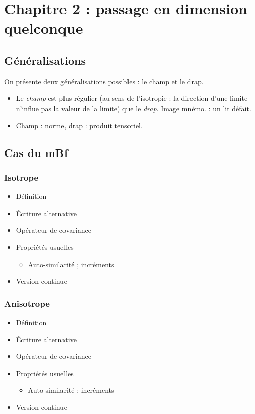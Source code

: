 \documentclass[11pt]{article}
\begin{document}
\section{Chapitre 2 : passage en dimension quelconque}
\label{sec:orga2e90c2}
\subsection{Généralisations}
\label{sec:org0454e05}
On présente deux généralisations possibles : le champ et le drap.
\begin{itemize}
\item Le \emph{champ} est plus régulier (au sens de l'isotropie : la direction
d'une limite n'influe pas la valeur de la limite) que le
\emph{drap}. Image mnémo. : un lit défait.
\item Champ : norme, drap : produit tensoriel.
\end{itemize}
\subsection{Cas du mBf}
\label{sec:org8ccdf5e}
\subsubsection{Isotrope}
\label{sec:org7930a3f}
\begin{itemize}
\item Définition
\item Écriture alternative
\item Opérateur de covariance
\item Propriétés usuelles
\begin{itemize}
\item Auto-similarité ; incréments
\end{itemize}
\item Version continue
\end{itemize}
\subsubsection{Anisotrope}
\label{sec:orgee8775b}
\begin{itemize}
\item Définition
\item Écriture alternative
\item Opérateur de covariance
\item Propriétés usuelles
\begin{itemize}
\item Auto-similarité ; incréments
\end{itemize}
\item Version continue
\end{itemize}
\end{document}
